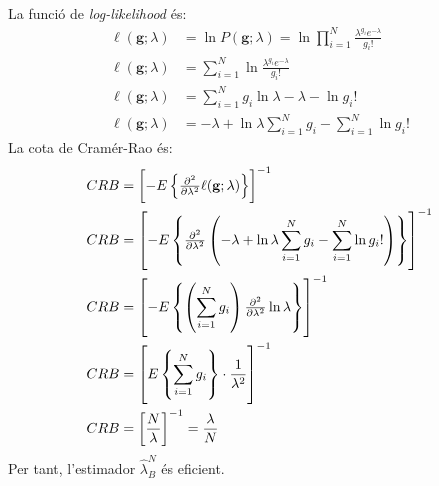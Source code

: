 \documentclass[catalan]{scrartcl}
\begin{document}
La funció de \emph{log-likelihood} és:
%
\begin{align}
  \ell(\mathbf{g};\lambda) &= \ln P(\mathbf{g};\lambda) =
    \ln \prod_{i=1}^N \frac{\lambda^{g_i} e^{-\lambda}}{g_i!}
\\
  \ell(\mathbf{g};\lambda) &=
    \sum_{i=1}^N \ln \frac{\lambda^{g_i} e^{-\lambda}}{g_i!}
\\
  \ell(\mathbf{g};\lambda) &=
    \sum_{i=1}^N g_i \ln \lambda -\lambda - \ln g_i!
\\
  \ell(\mathbf{g};\lambda) &=
    -\lambda + \ln \lambda \sum_{i=1}^N g_i - \sum_{i=1}^N \ln g_i!
\end{align}
%
La cota de Cramér-Rao és:
%
\begin{align}
  CRB &= \left[ -E\left\{ \pd[2]{}{\lambda} \ell(\mathbf{g};\lambda) \right\} \right]^{-1}
\\
  CRB &= \left[ -E\left\{ \pd[2]{}{\lambda}
    \left(-\lambda + \ln \lambda \sum_{i=1}^N g_i - \sum_{i=1}^N \ln g_i! \right)
  \right\} \right]^{-1}
\\
  CRB &= \left[ -E\left\{ \left(\sum_{i=1}^N g_i\right) \pd[2]{}{\lambda}
    \ln \lambda
  \right\} \right]^{-1}
\\
  CRB &= \left[ E\left\{ \sum_{i=1}^N g_i
  \right\} \cdot \frac{1}{\lambda^2} \right]^{-1}
\\
  CRB &= \left[ \frac{N}{\lambda} \right]^{-1} = \frac{\lambda}{N}
\end{align}
%
Per tant, l'estimador $\hat{\lambda}_B^N$ és eficient.
\end{document}
